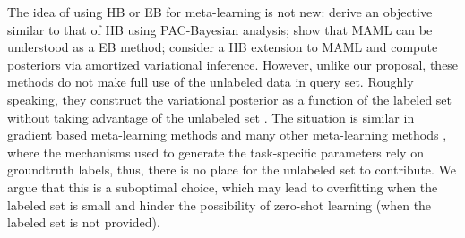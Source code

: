 \documentclass{article} \usepackage{iclr2020_conference,times}
\begin{document}
The idea of using HB or EB for meta-learning is not new: \citet{amit2018meta} derive an objective similar to that of HB 
using PAC-Bayesian analysis; \citet{grant2018recasting} show that MAML \citep{finn2017model} can be understood as a EB method;
\citet{ravi2018amortized} consider a HB extension to MAML and compute posteriors via amortized variational inference.
However, unlike our proposal, these methods do not make full use of the unlabeled data in query set. 
Roughly speaking, they construct the variational posterior as a function of the labeled set  without taking advantage of the unlabeled set . 
The situation is similar in gradient based meta-learning methods 
\citep{finn2017model,ravi2016optimization,li2017meta,nichol2018first,flennerhag2019transferring} 
and many other meta-learning methods \citep{vinyals2016matching,snell2017prototypical,gidaris2018dynamic}, 
where the mechanisms used to generate the task-specific parameters 
rely on groundtruth labels, thus, there is no place for the unlabeled set to contribute. 
We argue that this is a suboptimal choice,
which may lead to overfitting when the labeled set is small
and hinder the possibility of zero-shot learning (when the labeled set is not provided).
\end{document}
